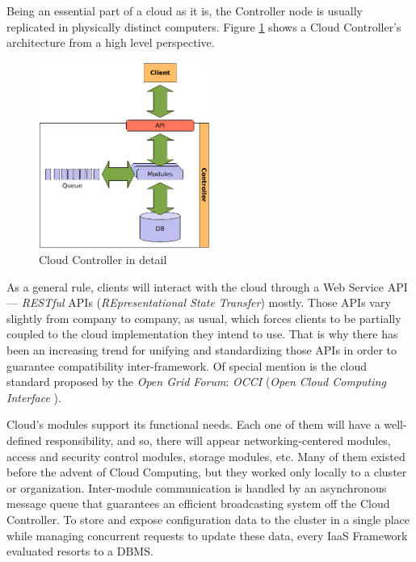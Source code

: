 Being an essential part of a cloud as it is, the Controller node is usually replicated in physically distinct computers. Figure \ref{fig:cloudcontroller} shows a Cloud Controller's architecture from a high level perspective.

\begin{figure}[tbp]
\begin{center}
\includegraphics[width=0.5\textwidth]{imagenes/005.pdf}
 \caption{Cloud Controller in detail}
\label{fig:cloudcontroller}
\end{center}
\end{figure}

As a general rule, clients will interact with the cloud through a Web Service API --- \emph{RESTful} APIs (\emph{REpresentational State Transfer}) mostly. Those APIs vary slightly from company to company, as usual, which forces clients to be partially coupled to the cloud implementation they intend to use. That is why there has been an increasing trend for unifying and standardizing those APIs in order to guarantee compatibility inter-framework. Of special mention is the cloud standard proposed by the \emph{Open Grid Forum}: \emph{OCCI} (\emph{Open Cloud Computing Interface} \cite{occisdraft}).

Cloud's modules support its functional needs. Each one of them will have a well-defined responsibility, and so, there will appear networking-centered modules, access and security control modules, storage modules, etc. Many of them existed before the advent of Cloud Computing, but they worked only locally to a cluster or organization. Inter-module communication is handled by an asynchronous message queue that guarantees an efficient broadcasting system off the Cloud Controller. To store and expose configuration data to the cluster in a single place while managing concurrent requests to update these data, every IaaS Framework evaluated resorts to a DBMS.

